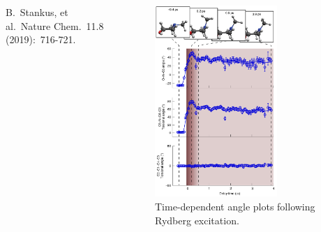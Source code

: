\documentclass{beamer}
\begin{document}
\begin{frame}
\begin{columns}
\begin{column}{.4\textwidth}
\begin{itemize}
		\end{itemize}
		{\tiny B.\ Stankus, et al.\ Nature Chem.\ 11.8 (2019):\ 716-721.}
		\end{column}
		\begin{column}{.6\textwidth}
			\begin{figure}[H]
				\centering
				\includegraphics[width=0.7\textwidth]{stankus_angle_plots.png}
				\caption{Time-dependent angle plots
					following Rydberg excitation.}
				\label{fig:nmm-geom}
			\end{figure}
		\end{column}%
		
	\end{columns}
\end{frame}
\end{document}
